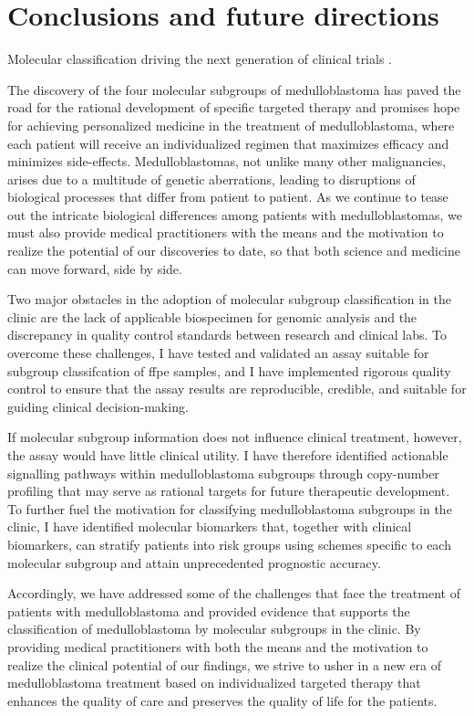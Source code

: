 \chapter{Conclusions and future directions}
\label{ch:conclusion}

Molecular classification driving the next generation of clinical trials .

The discovery of the four molecular subgroups of medulloblastoma has paved the road for the rational development of specific targeted therapy and promises hope for achieving personalized medicine in the treatment of medulloblastoma, where each patient will receive an individualized regimen that maximizes efficacy and minimizes side-effects. Medulloblastomas, not unlike many other malignancies, arises due to a multitude of genetic aberrations, leading to disruptions of biological processes that differ from patient to patient. As we continue to tease out the intricate biological differences among patients with medulloblastomas, we must also provide medical practitioners with the means and the motivation to realize the potential of our discoveries to date, so that both science and medicine can move forward, side by side.

Two major obstacles in the adoption of molecular subgroup classification in the clinic are the lack of applicable biospecimen for genomic analysis and the discrepancy in quality control standards between research and clinical labs. To overcome these challenges, I have tested and validated an assay suitable for subgroup classifcation of \gls{ffpe} samples, and I have implemented rigorous quality control to ensure that the assay results are reproducible, credible, and suitable for guiding clinical decision-making.

If molecular subgroup information does not influence clinical treatment, however, the assay would have little clinical utility. I have therefore identified actionable signalling pathways within medulloblastoma subgroups through copy-number profiling that may serve as rational targets for future therapeutic development. To further fuel the motivation for classifying medulloblastoma subgroups in the clinic, I have identified molecular biomarkers that, together with clinical biomarkers, can stratify patients into risk groups using schemes specific to each molecular subgroup and attain unprecedented prognostic accuracy.

Accordingly, we have addressed some of the challenges that face the treatment of patients with medulloblastoma and provided evidence that supports the classification of medulloblastoma by molecular subgroups in the clinic. By providing medical practitioners with both the means and the motivation to realize the clinical potential of our findings, we strive to usher in a new era of medulloblastoma treatment based on individualized targeted therapy that enhances the quality of care and preserves the quality of life for the patients.

